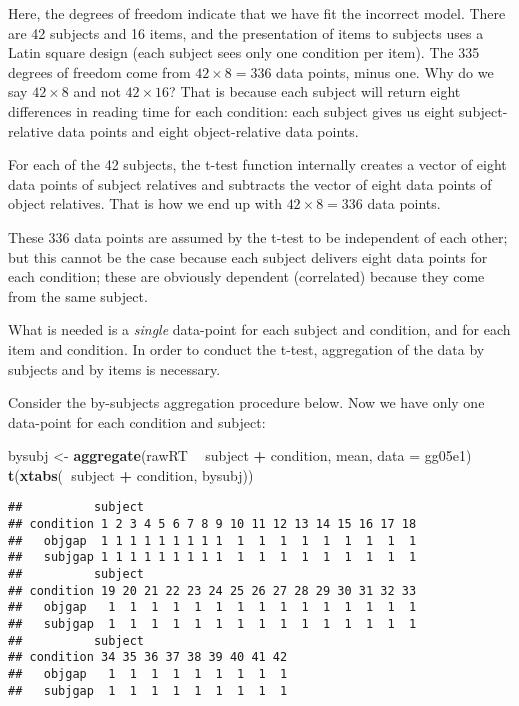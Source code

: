 \documentclass[12pt,]{krantz}
\newenvironment{Shaded}{\begin{snugshade}}{\end{snugshade}}
\newcommand{\DataTypeTok}[1]{\textcolor[rgb]{0.13,0.29,0.53}{#1}}
\newcommand{\KeywordTok}[1]{\textcolor[rgb]{0.13,0.29,0.53}{\textbf{#1}}}
\newcommand{\NormalTok}[1]{#1}
\newcommand{\OperatorTok}[1]{\textcolor[rgb]{0.81,0.36,0.00}{\textbf{#1}}}
\newcommand{\StringTok}[1]{\textcolor[rgb]{0.31,0.60,0.02}{#1}}
\begin{document}
Here, the degrees of freedom indicate that we have fit the incorrect model. There are 42 subjects and 16 items, and the presentation of items to subjects uses a Latin square design (each subject sees only one condition per item). The 335 degrees of freedom come from \(42\times 8=336\) data points, minus one. Why do we say \(42\times 8\) and not \(42\times 16\)? That is because each subject will return eight differences in reading time for each condition: each subject gives us eight subject-relative data points and eight object-relative data points.

For each of the 42 subjects, the t-test function internally creates a vector of eight data points of subject relatives and subtracts the vector of eight data points of object relatives. That is how we end up with \(42\times 8=336\) data points.

These 336 data points are assumed by the t-test to be independent of each other; but this cannot be the case because each subject delivers eight data points for each condition; these are obviously dependent (correlated) because they come from the same subject.

What is needed is a \emph{single} data-point for each subject and condition, and for each item and condition. In order to conduct the t-test, aggregation of the data by subjects and by items is necessary.

Consider the by-subjects aggregation procedure below. Now we have only one data-point for each condition and subject:

\begin{Shaded}
\begin{Highlighting}[]
\NormalTok{bysubj <-}\StringTok{ }\KeywordTok{aggregate}\NormalTok{(rawRT }\OperatorTok{~}\StringTok{ }\NormalTok{subject }\OperatorTok{+}\StringTok{ }\NormalTok{condition, }
\NormalTok{  mean, }\DataTypeTok{data =}\NormalTok{ gg05e1)}
\KeywordTok{t}\NormalTok{(}\KeywordTok{xtabs}\NormalTok{(}\OperatorTok{~}\NormalTok{subject }\OperatorTok{+}\StringTok{ }\NormalTok{condition, bysubj))}
\end{Highlighting}
\end{Shaded}

\begin{verbatim}
##          subject
## condition 1 2 3 4 5 6 7 8 9 10 11 12 13 14 15 16 17 18
##   objgap  1 1 1 1 1 1 1 1 1  1  1  1  1  1  1  1  1  1
##   subjgap 1 1 1 1 1 1 1 1 1  1  1  1  1  1  1  1  1  1
##          subject
## condition 19 20 21 22 23 24 25 26 27 28 29 30 31 32 33
##   objgap   1  1  1  1  1  1  1  1  1  1  1  1  1  1  1
##   subjgap  1  1  1  1  1  1  1  1  1  1  1  1  1  1  1
##          subject
## condition 34 35 36 37 38 39 40 41 42
##   objgap   1  1  1  1  1  1  1  1  1
##   subjgap  1  1  1  1  1  1  1  1  1
\end{verbatim}
\end{document}
